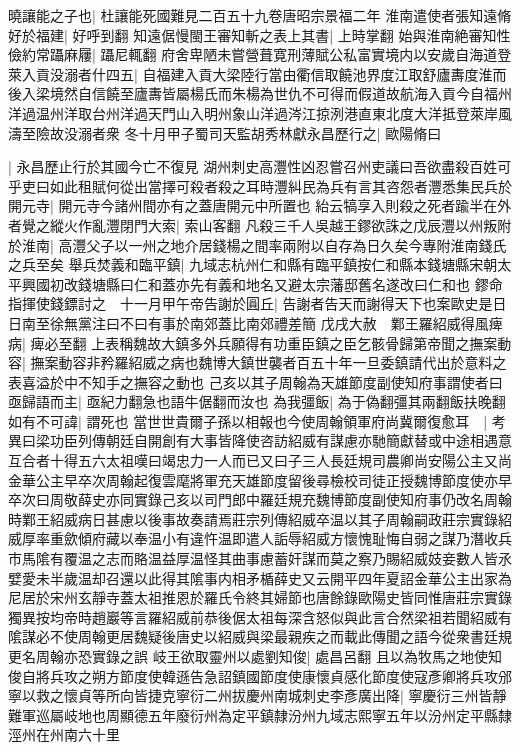 曉讓能之子也|{
	杜讓能死國難見二百五十九卷唐昭宗景福二年}
淮南遣使者張知遠脩好於福建|{
	好呼到翻}
知遠倨慢閩王審知斬之表上其書|{
	上時掌翻}
始與淮南絶審知性儉約常躡麻屨|{
	躡尼輒翻}
府舍卑陋未嘗營葺寛刑薄賦公私富實境内以安歲自海道登萊入貢没溺者什四五|{
	自福建入貢大梁陸行當由衢信取饒池界度江取舒廬夀度淮而後入梁境然自信饒至廬夀皆屬楊氏而朱楊為世仇不可得而假道故航海入貢今自福州洋過温州洋取台州洋過天門山入明州象山洋過涔江掠洌港直東北度大洋抵登萊岸風濤至險故没溺者衆}
冬十月甲子蜀司天監胡秀林獻永昌歷行之|{
	歐陽脩曰}


|{
	永昌歷止行於其國今亡不復見}
湖州刺史高灃性凶忍嘗召州吏議曰吾欲盡殺百姓可乎吏曰如此租賦何從出當擇可殺者殺之耳時灃糾民為兵有言其咨怨者灃悉集民兵於開元寺|{
	開元寺今諸州間亦有之蓋唐開元中所置也}
紿云犒享入則殺之死者踰半在外者覺之縱火作亂灃閉門大索|{
	索山客翻}
凡殺三千人吳越王鏐欲誅之戊辰灃以州叛附於淮南|{
	高灃父子以一州之地介居錢楊之間率兩附以自存為日久矣今專附淮南錢氏之兵至矣}
舉兵焚義和臨平鎮|{
	九域志杭州仁和縣有臨平鎮按仁和縣本錢塘縣宋朝太平興國初改錢塘縣曰仁和蓋亦先有義和地名又避太宗藩邸舊名遂改曰仁和也}
鏐命指揮使錢鏢討之　十一月甲午帝告謝於圓丘|{
	告謝者告天而謝得天下也案歐史是日日南至徐無黨注曰不曰有事於南郊蓋比南郊禮差簡}
戊戌大赦　鄴王羅紹威得風痺病|{
	痺必至翻}
上表稱魏故大鎮多外兵願得有功重臣鎮之臣乞骸骨歸第帝聞之撫案動容|{
	撫案動容非矜羅紹威之病也魏博大鎮世襲者百五十年一旦委鎮請代出於意料之表喜溢於中不知手之撫容之動也}
己亥以其子周翰為天雄節度副使知府事謂使者曰亟歸語而主|{
	亟紀力翻急也語牛倨翻而汝也}
為我彊飯|{
	為于偽翻彊其兩翻飯扶晚翻}
如有不可諱|{
	謂死也}
當世世貴爾子孫以相報也今使周翰領軍府尚冀爾復愈耳　|{
	考異曰梁功臣列傳朝廷自開創有大事皆降使咨訪紹威有謀慮亦馳簡獻替或中途相遇意互合者十得五六太祖嘆曰竭忠力一人而已又曰子三人長廷規司農卿尚安陽公主又尚金華公主早卒次周翰起復雲麾將軍充天雄節度留後尋檢校司徒正授魏博節度使亦早卒次曰周敬薛史亦同實錄己亥以司門郎中羅廷規充魏博節度副使知府事仍改名周翰時鄴王紹威病日甚慮以後事故奏請焉莊宗列傳紹威卒温以其子周翰嗣政莊宗實錄紹威厚率重歛傾府藏以奉温小有違忤温即遣人詬辱紹威方懷愧耻悔自弱之謀乃潛收兵市馬隂有覆温之志而賂温益厚温怪其曲事慮蓄奸謀而莫之察乃賜紹威妓妾數人皆氶嬖愛未半歲温却召還以此得其隂事内相矛楯薛史又云開平四年夏詔金華公主出家為尼居於宋州玄靜寺蓋太祖推恩於羅氏令終其婦節也唐餘錄歐陽史皆同惟唐莊宗實錄獨異按均帝時趙巖等言羅紹威前恭後倨太祖每深含怒似與此言合然梁祖若聞紹威有隂謀必不使周翰更居魏疑後唐史以紹威與梁最親疾之而載此傳聞之語今從衆書廷規更名周翰亦恐實錄之誤}
岐王欲取靈州以處劉知俊|{
	處昌呂翻}
且以為牧馬之地使知俊自將兵攻之朔方節度使韓遜告急詔鎮國節度使康懷貞感化節度使寇彥卿將兵攻邠寧以救之懷貞等所向皆捷克寧衍二州拔慶州南城刺史李彥廣出降|{
	寧慶衍三州皆靜難軍巡屬岐地也周顯德五年廢衍州為定平鎮隸汾州九域志熙寧五年以汾州定平縣隸涇州在州南六十里}

